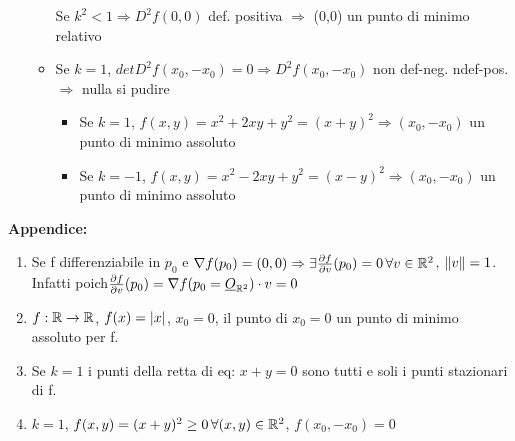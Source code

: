 \begin{example}[1a,foglio 5]
\begin{itemize}
\begin{itemize}
\begin{exercise}
              Se $k^2 < 1 \Rightarrow D^2 f(0,0)$ \ace def. positiva $\Rightarrow$ (0,0) \ace un punto di minimo relativo
            \end{exercise}
            \item Se $k=1$, $detD^2f(x_0,-x_0) = 0 \Rightarrow D^2f(x_0,-x_0)$ non \ace def-neg. n\ace def-pos. $\Rightarrow$ nulla si pu\aco dire
              \begin{itemize}
                \item Se $k=1$, $f(x,y) = x^2+2xy+y^2 = (x+y)^2 \Rightarrow (x_0,-x_0)$ \ace un punto di minimo assoluto
                \item Se $k=-1$, $f(x,y) = x^2-2xy+y^2 = (x-y)^2 \Rightarrow (x_0,-x_0)$ \ace un punto di minimo assoluto
              \end{itemize}
          \end{itemize}
  \end{itemize}
\end{example}
\textbf{Appendice:}
\begin{enumerate}
  \item Se f \ace differenziabile in $p_0$ e $\nabla f(p_0) = (0,0) \Rightarrow \exists \frac{\partial f}{\partial v}(p_0)=0 \, 
        \forall v \in \mathbb{R}^2$, $\left\lVert v\right\rVert=1$. \\
        Infatti poich\ace $\frac{\partial f}{\partial v}(p_0) = \nabla f (p_0 = \underline{O}_{\mathbb{R}^2}) \cdot v = 0$
  \item $f : \mathbb{R} \to \mathbb{R}$, $f(x) = \left\lvert x \right\rvert$, $x_0 = 0$, il punto di $x_0=0$ \ace un punto di minimo assoluto per f.
  \item Se $k=1$ i punti della retta di eq: $x+y=0$ sono tutti e soli i punti stazionari di f.
  \item $k=1$, $f(x,y) = (x+y)^2 \geq 0 \, \forall (x,y)\in \mathbb{R}^2$, $f(x_0,-x_0)=0$
\end{enumerate}